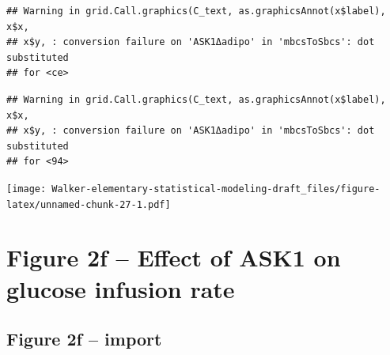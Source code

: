 \documentclass[]{book}
\newenvironment{Shaded}{\begin{snugshade}}{\end{snugshade}}
\newcommand{\DataTypeTok}[1]{\textcolor[rgb]{0.13,0.29,0.53}{#1}}
\newcommand{\DecValTok}[1]{\textcolor[rgb]{0.00,0.00,0.81}{#1}}
\newcommand{\ErrorTok}[1]{\textcolor[rgb]{0.64,0.00,0.00}{\textbf{#1}}}
\newcommand{\KeywordTok}[1]{\textcolor[rgb]{0.13,0.29,0.53}{\textbf{#1}}}
\newcommand{\NormalTok}[1]{#1}
\newcommand{\OperatorTok}[1]{\textcolor[rgb]{0.81,0.36,0.00}{\textbf{#1}}}
\newcommand{\OtherTok}[1]{\textcolor[rgb]{0.56,0.35,0.01}{#1}}
\newcommand{\StringTok}[1]{\textcolor[rgb]{0.31,0.60,0.02}{#1}}
\begin{document}
\begin{verbatim}
## Warning in grid.Call.graphics(C_text, as.graphicsAnnot(x$label), x$x,
## x$y, : conversion failure on 'ASK1Δadipo' in 'mbcsToSbcs': dot substituted
## for <ce>
\end{verbatim}

\begin{verbatim}
## Warning in grid.Call.graphics(C_text, as.graphicsAnnot(x$label), x$x,
## x$y, : conversion failure on 'ASK1Δadipo' in 'mbcsToSbcs': dot substituted
## for <94>
\end{verbatim}

\texttt{[image: Walker-elementary-statistical-modeling-draft\_files/figure-latex/unnamed-chunk-27-1.pdf]}

\hypertarget{figure-2f-effect-of-ask1-on-glucose-infusion-rate}{%
\section{Figure 2f -- Effect of ASK1 on glucose infusion rate}\label{figure-2f-effect-of-ask1-on-glucose-infusion-rate}}

\hypertarget{figure-2f-import}{%
\subsection{Figure 2f -- import}\label{figure-2f-import}}

\begin{Shaded}
\end{Shaded}
\end{document}
